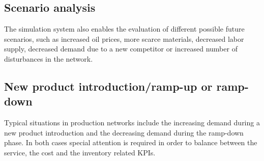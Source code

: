 \documentclass{article}
\begin{document}
\subsection{Scenario analysis}

The simulation system also enables the evaluation of different possible future scenarios, such as increased oil prices, more scarce materials, decreased labor supply, decreased demand due to a new competitor or increased number of disturbances in the network.


\subsection{New product introduction/ramp-up or ramp-down}

Typical situations in production networks include the increasing demand during a new product introduction and the decreasing demand during the ramp-down phase. In both cases special attention is required in order to balance between the service, the cost and the inventory related KPIs.
\end{document}
